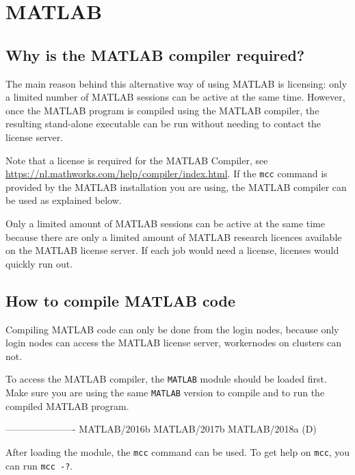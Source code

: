 \chapter{MATLAB}
\label{ch:matlab}

\section{Why is the MATLAB compiler required?}

The main reason behind this alternative way of using MATLAB is licensing: only
a limited number of MATLAB sessions can be active at the same time. However, once
the MATLAB program is compiled using the MATLAB compiler, the resulting stand-alone
executable can be run without needing to contact the license server.

Note that a license is required for the MATLAB Compiler,
see \url{https://nl.mathworks.com/help/compiler/index.html}. If the \lstinline|mcc|
command is provided by the MATLAB installation you are using, the MATLAB compiler
can be used as explained below.

\ifgent
Only a limited amount of MATLAB sessions can be active at the same time because
there are only a limited amount of MATLAB research licences available on
the \university MATLAB license server. If each job would need a license,
licenses would quickly run out.
\fi

\section{How to compile MATLAB code}

Compiling MATLAB code can only be done from the login nodes, because only login
nodes can access the MATLAB license server, workernodes on clusters can not.

To access the MATLAB compiler, the \lstinline|MATLAB| module should be loaded first. Make sure
you are using the same \lstinline|MATLAB| version to compile and to run the compiled MATLAB
program.

\begin{prompt}
----------------------%
   MATLAB/2016b    MATLAB/2017b    MATLAB/2018a (D)
\end{prompt}

After loading the module, the \lstinline|mcc| command can be used. To get help on
\lstinline|mcc|, you can run \lstinline|mcc -?|.

